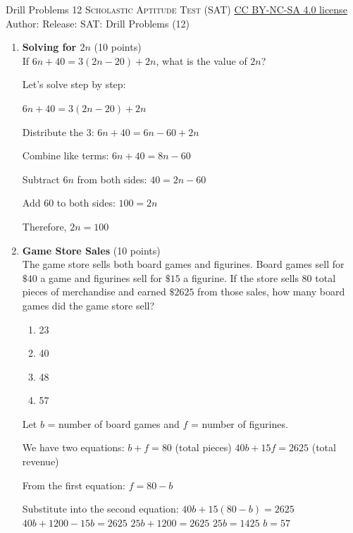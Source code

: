 \newpage\handout
{Drill Problems 12}
{\textsc{Scholastic Aptitude Test (SAT)}}
{\href{https://creativecommons.org/licenses/by-nc-sa/4.0/}{CC BY-NC-SA 4.0 license}}
{Author: \BookAuthor}{Release: \generatedOn}
{SAT: Drill Problems (12)}





\begin{enumerate}
  \item \textbf{Solving for $2n$} (10 points)\\
  If $6n + 40 = 3(2n - 20) + 2n$, what is the value of $2n$?
  \begin{subanswer}
    Let's solve step by step:
    
    $6n + 40 = 3(2n - 20) + 2n$
    
    Distribute the 3: $6n + 40 = 6n - 60 + 2n$
    
    Combine like terms: $6n + 40 = 8n - 60$
    
    Subtract $6n$ from both sides: $40 = 2n - 60$
    
    Add 60 to both sides: $100 = 2n$
    
    Therefore, $2n = 100$
  \end{subanswer}



  \item \textbf{Game Store Sales} (10 points)\\
  The game store sells both board games and figurines. Board games sell for $\$40$ 
  a game and figurines sell for $\$15$ a figurine. If the store sells 80 total pieces 
  of merchandise and earned $\$2625$ from those sales, how many board games did the 
  game store sell?
  \begin{enumerate}[label=(\Alph*)]
    \item 23
    \item 40
    \item 48
    \item 57
  \end{enumerate}
  \begin{subanswer}
    Let $b$ = number of board games and $f$ = number of figurines.
    
    We have two equations:
    $b + f = 80$ (total pieces)
    $40b + 15f = 2625$ (total revenue)
    
    From the first equation: $f = 80 - b$
    
    Substitute into the second equation:
    $40b + 15(80 - b) = 2625$
    $40b + 1200 - 15b = 2625$
    $25b + 1200 = 2625$
    $25b = 1425$
    $b = 57$
    

\end{subanswer}
\end{enumerate}
